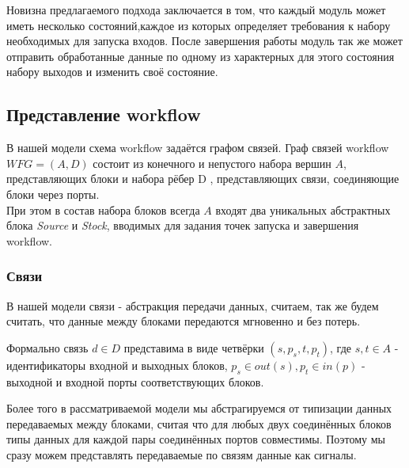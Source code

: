 \documentclass[a4paper,12pt]{article}
\begin{document}
Новизна предлагаемого подхода заключается в том, что каждый модуль может иметь несколько состояний,каждое из которых определяет требования к набору необходимых для запуска входов. После завершения работы модуль так же может отправить обработанные данные по одному из характерных для этого состояния набору выходов и изменить своё состояние.\\






\subsection{Представление workflow}
В нашей модели схема workflow задаётся графом связей.
 Граф связей workflow $WFG =(A, D)$ состоит из конечного и непустого набора вершин $A$, представляющих блоки и набора рёбер D , представляющих связи, соединяющие блоки через порты.\\
 При этом в состав набора блоков всегда $A$ входят два уникальных абстрактных блока \textit{Source} и \textit{Stock}, вводимых для задания точек запуска и завершения workflow.

\subsubsection{Связи} 
В нашей модели связи - абстракция передачи данных, считаем, так же будем считать, что данные между блоками передаются мгновенно и без потерь.

 Формально связь $d \in D$ представима в виде четвёрки $(s, p_{s}, t, p_{t})$, где $s,t \in A$ - идентификаторы входной и выходных блоков,  $ p_{s} \in out(s), p_{t} \in in(p)$ - выходной и входной порты соответствующих блоков. 

Более того в рассматриваемой модели мы абстрагируемся от типизации данных передаваемых между блоками, считая что для любых двух соединённых блоков типы данных для каждой пары соединённых портов совместимы. Поэтому мы сразу можем представлять передаваемые по связям данные как сигналы.
\end{document}
